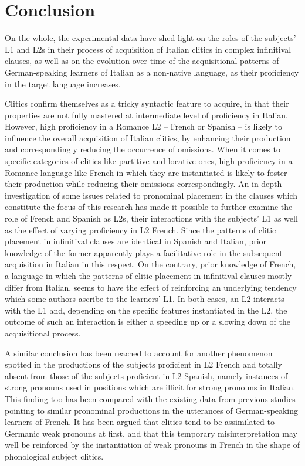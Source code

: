 \documentclass[output=paper,modfonts,nonflat,newtxmath]{langsci/langscibook}
\begin{document}
\section{Conclusion} %
\label{sec:sciutti:6}

On the whole, the experimental data have shed light on the roles of the subjects’ L1 and L2s in their process of acquisition of Italian clitics in complex infinitival clauses, as well as on the evolution over time of the acquisitional patterns of German-speaking learners of Italian as a non-native language, as their proficiency in the target language increases.

Clitics confirm themselves as a tricky syntactic feature to acquire, in that their properties are not fully mastered at intermediate level of proficiency in Italian. However, high proficiency in a Romance L2 – French or Spanish – is likely to influence the overall acquisition of Italian clitics, by enhancing their production and correspondingly reducing the occurrence of omissions. When it comes to specific categories of clitics like partitive and locative ones, high proficiency in a Romance language like French in which they are instantiated is likely to foster their production while reducing their omissions correspondingly. An in-depth investigation of some issues related to pronominal placement in the clauses which constitute the focus of this research has made it possible to further examine the role of French and Spanish as L2s, their interactions with the subjects’ L1 as well as the effect of varying proficiency in L2 French. Since the patterns of clitic placement in infinitival clauses are identical in Spanish and Italian, prior knowledge of the former apparently plays a facilitative role in the subsequent acquisition in Italian in this respect. On the contrary, prior knowledge of French, a language in which the patterns of clitic placement in infinitival clauses mostly differ from Italian, seems to have the effect of reinforcing an underlying tendency which some authors ascribe to the learners’ L1. In both cases, an L2 interacts with the L1 and, depending on the specific features instantiated in the L2, the outcome of such an interaction is either a speeding up or a slowing down of the acquisitional process.

A similar conclusion has been reached to account for another phenomenon spotted in the productions of the subjects proficient in L2 French and totally absent from those of the subjects proficient in L2 Spanish, namely instances of strong pronouns used in positions which are illicit for strong pronouns in Italian. This finding too has been compared with the existing data from previous studies pointing to similar pronominal productions in the utterances of German-speaking learners of French. It has been argued that clitics tend to be assimilated to Germanic weak pronouns at first, and that this temporary misinterpretation may well be reinforced by the instantiation of weak pronouns in French in the shape of phonological subject clitics.
\end{document}
